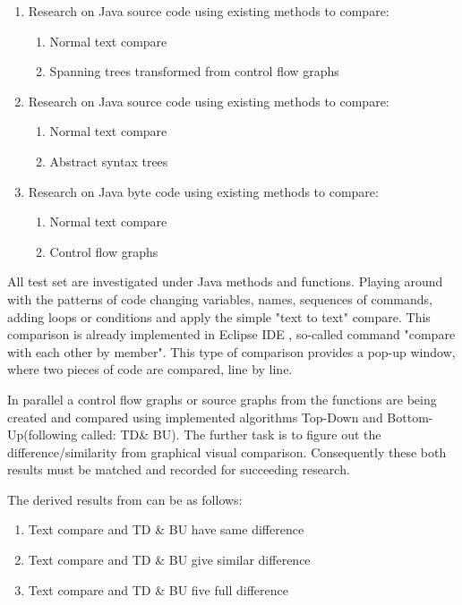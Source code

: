 \documentclass{report}
\begin{document}
\begin{enumerate}
  \item Research on Java source code using existing methods to compare:
  	\begin{enumerate}
   	 	\item Normal text compare
   		 \item Spanning trees transformed from control flow graphs
	 \end{enumerate}	
	 
  \item Research on Java source code using existing methods to compare:
  \begin{enumerate}
    \item Normal text compare 
    \item Abstract syntax trees
  \end{enumerate}
  
  \item Research on Java byte code using existing methods to compare:
  \begin{enumerate}
    \item Normal text compare 
    \item Control flow graphs
  \end{enumerate}
\end{enumerate}

All test set are investigated under Java methods and functions. Playing around with the patterns of code changing variables, names, sequences of commands, adding loops or conditions and apply the simple "text to text" compare. This comparison is already implemented in Eclipse IDE \cite{eclipse_site}, so-called command "compare with each other by member". This type of comparison provides a pop-up window, where two pieces of code are compared, line by line.


In parallel a control flow graphs or source graphs from the functions are being created and compared using implemented algorithms Top-Down and Bottom-Up(following called: TD\& BU). The further task is to figure out the difference/similarity from graphical visual comparison. Consequently these both results must be matched and recorded for succeeding research.

The derived results from can be as follows: 
\begin{enumerate}
  \item Text compare and TD \& BU have same difference
  \item Text compare and TD \& BU give similar difference
  \item Text compare and TD \& BU five full difference
\end{enumerate}
\end{document}
